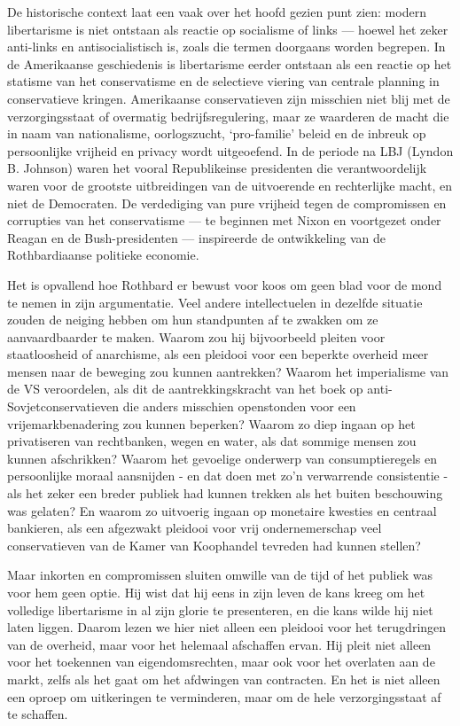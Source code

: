\documentclass[
  a5paper,
  smalldemyvopaper,10pt,twoside,onecolumn,openright,extrafontsizes,hidelinks]{memoir}
\begin{document}
De historische context laat een vaak over het hoofd gezien punt zien:
modern libertarisme is niet ontstaan als reactie op socialisme of links
--- hoewel het zeker anti-links en antisocialistisch is, zoals die
termen doorgaans worden begrepen. In de Amerikaanse geschiedenis is
libertarisme eerder ontstaan als een reactie op het statisme van het
conservatisme en de selectieve viering van centrale planning in
conservatieve kringen. Amerikaanse conservatieven zijn misschien niet
blij met de verzorgingsstaat of overmatig bedrijfsregulering, maar ze
waarderen de macht die in naam van nationalisme, oorlogszucht,
`pro-familie' beleid en de inbreuk op persoonlijke vrijheid en privacy
wordt uitgeoefend. In de periode na LBJ (Lyndon B. Johnson) waren het
vooral Republikeinse presidenten die verantwoordelijk waren voor de
grootste uitbreidingen van de uitvoerende en rechterlijke macht, en niet
de Democraten. De verdediging van pure vrijheid tegen de compromissen en
corrupties van het conservatisme --- te beginnen met Nixon en voortgezet
onder Reagan en de Bush-presidenten --- inspireerde de ontwikkeling van
de Rothbardiaanse politieke economie.

Het is opvallend hoe Rothbard er bewust voor koos om geen blad voor de
mond te nemen in zijn argumentatie. Veel andere intellectuelen in
dezelfde situatie zouden de neiging hebben om hun standpunten af te
zwakken om ze aanvaardbaarder te maken. Waarom zou hij bijvoorbeeld
pleiten voor staatloosheid of anarchisme, als een pleidooi voor een
beperkte overheid meer mensen naar de beweging zou kunnen aantrekken?
Waarom het imperialisme van de VS veroordelen, als dit de
aantrekkingskracht van het boek op anti-Sovjetconservatieven die anders
misschien openstonden voor een vrijemarkbenadering zou kunnen beperken?
Waarom zo diep ingaan op het privatiseren van rechtbanken, wegen en
water, als dat sommige mensen zou kunnen afschrikken? Waarom het
gevoelige onderwerp van consumptieregels en persoonlijke moraal
aansnijden - en dat doen met zo'n verwarrende consistentie - als het
zeker een breder publiek had kunnen trekken als het buiten beschouwing
was gelaten? En waarom zo uitvoerig ingaan op monetaire kwesties en
centraal bankieren, als een afgezwakt pleidooi voor vrij ondernemerschap
veel conservatieven van de Kamer van Koophandel tevreden had kunnen
stellen?

Maar inkorten en compromissen sluiten omwille van de tijd of het publiek
was voor hem geen optie. Hij wist dat hij eens in zijn leven de kans
kreeg om het volledige libertarisme in al zijn glorie te presenteren, en
die kans wilde hij niet laten liggen. Daarom lezen we hier niet alleen
een pleidooi voor het terugdringen van de overheid, maar voor het
helemaal afschaffen ervan. Hij pleit niet alleen voor het toekennen van
eigendomsrechten, maar ook voor het overlaten aan de markt, zelfs als
het gaat om het afdwingen van contracten. En het is niet alleen een
oproep om uitkeringen te verminderen, maar om de hele verzorgingsstaat
af te schaffen.
\end{document}
